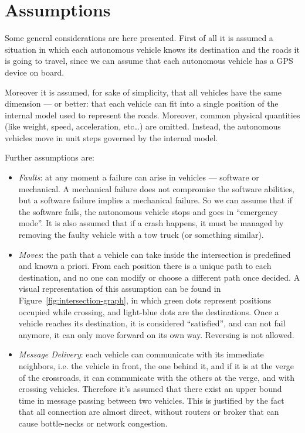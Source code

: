 \documentclass{memoir}
\begin{document}
\section{Assumptions}

Some general considerations are here presented. First of all it is assumed a situation in which each autonomous vehicle knows its destination and the roads it is going to travel, since we can assume that each autonomous vehicle has a GPS device on board.

Moreover it is assumed, for sake of simplicity, that all vehicles have the same dimension --- or better: that each vehicle can fit into a single position of the internal model used to represent the roads. Moreover, common physical quantities (like weight, speed, acceleration, etc\dots) are omitted. Instead, the autonomous vehicles move in unit steps governed by the internal model.
\newline

Further assumptions are:

\begin{itemize}
	\item \emph{Faults}: at any moment a failure can arise in vehicles --- software or mechanical. A mechanical failure does not compromise the software abilities, but a software failure implies a mechanical failure. So we can assume that if the software fails, the autonomous vehicle stops and goes in ``emergency mode''. It is also assumed that if a crash happens, it must be managed by removing the faulty vehicle with a tow truck (or something similar).
	\item \emph{Moves}: the path that a vehicle can take inside the intersection is predefined and known a priori. From each position there is a unique path to each destination, and no one can modify or choose a different path once decided. A visual representation of this assumption can be found in Figure~\ref{fig:intersection-graph}, in which green dots represent positions occupied while crossing, and light-blue dots are the destinations. Once a vehicle reaches its destination, it is considered ``satisfied'', and can not fail anymore, it can only move forward on its own way. Reversing is not allowed.
	\item \emph{Message Delivery}: each vehicle can communicate with its immediate neighbors, i.e. the vehicle in front, the one behind it, and if it is at the verge of the crossroads, it can communicate with the others at the verge, and with crossing vehicles. Therefore it's assumed that there exist an upper bound time in message passing between two vehicles. This is justified by the fact that all connection are almost direct, without routers or broker that can cause bottle-necks or network congestion.
\end{itemize}
\end{document}
